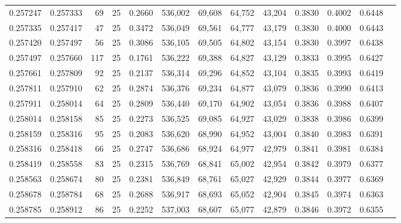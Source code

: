 \begin{tabular}{rrrrrrrrrrrrr}
0.257247 & 0.257333 &    69 &  25 &                                     0.2660 & 536,002 &  69,608 &  64,752 &  43,204 & 0.3830 & 0.4002 & 0.6448 \\
0.257335 & 0.257417 &    47 &  25 &                                     0.3472 & 536,049 &  69,561 &  64,777 &  43,179 & 0.3830 & 0.4000 & 0.6443 \\
0.257420 & 0.257497 &    56 &  25 &                                     0.3086 & 536,105 &  69,505 &  64,802 &  43,154 & 0.3830 & 0.3997 & 0.6438 \\
0.257497 & 0.257660 &   117 &  25 &                                     0.1761 & 536,222 &  69,388 &  64,827 &  43,129 & 0.3833 & 0.3995 & 0.6427 \\
0.257661 & 0.257809 &    92 &  25 &                                     0.2137 & 536,314 &  69,296 &  64,852 &  43,104 & 0.3835 & 0.3993 & 0.6419 \\
0.257811 & 0.257910 &    62 &  25 &                                     0.2874 & 536,376 &  69,234 &  64,877 &  43,079 & 0.3836 & 0.3990 & 0.6413 \\
0.257911 & 0.258014 &    64 &  25 &                                     0.2809 & 536,440 &  69,170 &  64,902 &  43,054 & 0.3836 & 0.3988 & 0.6407 \\
0.258014 & 0.258158 &    85 &  25 &                                     0.2273 & 536,525 &  69,085 &  64,927 &  43,029 & 0.3838 & 0.3986 & 0.6399 \\
0.258159 & 0.258316 &    95 &  25 &                                     0.2083 & 536,620 &  68,990 &  64,952 &  43,004 & 0.3840 & 0.3983 & 0.6391 \\
0.258316 & 0.258418 &    66 &  25 &                                     0.2747 & 536,686 &  68,924 &  64,977 &  42,979 & 0.3841 & 0.3981 & 0.6384 \\
0.258419 & 0.258558 &    83 &  25 &                                     0.2315 & 536,769 &  68,841 &  65,002 &  42,954 & 0.3842 & 0.3979 & 0.6377 \\
0.258563 & 0.258674 &    80 &  25 &                                     0.2381 & 536,849 &  68,761 &  65,027 &  42,929 & 0.3844 & 0.3977 & 0.6369 \\
0.258678 & 0.258784 &    68 &  25 &                                     0.2688 & 536,917 &  68,693 &  65,052 &  42,904 & 0.3845 & 0.3974 & 0.6363 \\
0.258785 & 0.258912 &    86 &  25 &                                     0.2252 & 537,003 &  68,607 &  65,077 &  42,879 & 0.3846 & 0.3972 & 0.6355 \\

\end{tabular}
